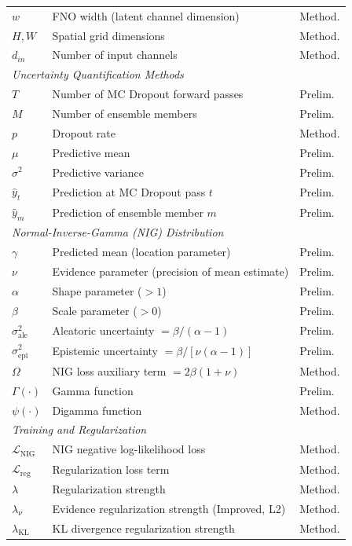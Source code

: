 \begin{table}[!ht]
\begin{tabular}{lll}
$w$ & FNO width (latent channel dimension) & Method. \\
$H, W$ & Spatial grid dimensions & Method. \\
$d_{in}$ & Number of input channels & Method. \\
\midrule
\multicolumn{3}{l}{\textit{Uncertainty Quantification Methods}} \\
$T$ & Number of MC Dropout forward passes & Prelim. \\
$M$ & Number of ensemble members & Prelim. \\
$p$ & Dropout rate & Method. \\
$\mu$ & Predictive mean & Prelim. \\
$\sigma^2$ & Predictive variance & Prelim. \\
$\hat{y}_t$ & Prediction at MC Dropout pass $t$ & Prelim. \\
$\hat{y}_m$ & Prediction of ensemble member $m$ & Prelim. \\
\midrule
\multicolumn{3}{l}{\textit{Normal-Inverse-Gamma (NIG) Distribution}} \\
$\gamma$ & Predicted mean (location parameter) & Prelim. \\
$\nu$ & Evidence parameter (precision of mean estimate) & Prelim. \\
$\alpha$ & Shape parameter ($> 1$) & Prelim. \\
$\beta$ & Scale parameter ($> 0$) & Prelim. \\
$\sigma^2_{\text{ale}}$ & Aleatoric uncertainty $= \beta / (\alpha - 1)$ & Prelim. \\
$\sigma^2_{\text{epi}}$ & Epistemic uncertainty $= \beta / [\nu(\alpha - 1)]$ & Prelim. \\
$\Omega$ & NIG loss auxiliary term $= 2\beta(1 + \nu)$ & Method. \\
$\Gamma(\cdot)$ & Gamma function & Prelim. \\
$\psi(\cdot)$ & Digamma function & Method. \\
\midrule
\multicolumn{3}{l}{\textit{Training and Regularization}} \\
$\mathcal{L}_{\text{NIG}}$ & NIG negative log-likelihood loss & Method. \\
$\mathcal{L}_{\text{reg}}$ & Regularization loss term & Method. \\
$\lambda$ & Regularization strength & Method. \\
$\lambda_\nu$ & Evidence regularization strength (Improved, L2) & Method. \\
$\lambda_{\text{KL}}$ & KL divergence regularization strength & Method. \\

\end{tabular}
\end{table}
